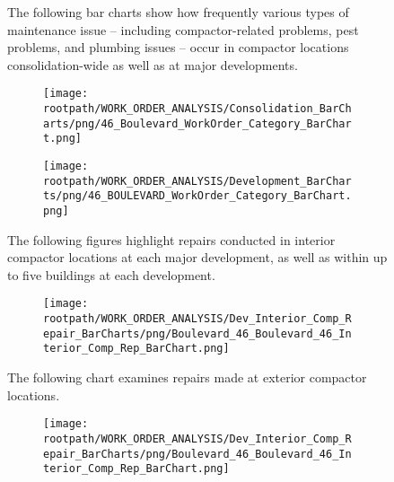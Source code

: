 \begin{figure}[h]
                                \sf
                                The following bar charts show how frequently various types of maintenance issue -- including compactor-related problems, pest problems, and plumbing issues -- occur in compactor locations consolidation-wide as well as at major developments.
                                \raggedright
                                \begin{subfigure}{\textwidth}
                                \texttt{[image: \\rootpath/WORK\_ORDER\_ANALYSIS/Consolidation\_BarCharts/png/46\_Boulevard\_WorkOrder\_Category\_BarChart.png]}
                                \end{subfigure}
                                \begin{subfigure}{\textwidth}
                                    \texttt{[image: \\rootpath/WORK\_ORDER\_ANALYSIS/Development\_BarCharts/png/46\_BOULEVARD\_WorkOrder\_Category\_BarChart.png]}
                                    \end{subfigure}
                                    \end{figure}\begin{figure}[h]
                                \raggedright
                                \sf
                                The following figures highlight repairs conducted in interior compactor locations at each major development, as well as within up to five buildings at each development.\\
                                \begin{subfigure}{\textwidth}
                                    \texttt{[image: \\rootpath/WORK\_ORDER\_ANALYSIS/Dev\_Interior\_Comp\_Repair\_BarCharts/png/Boulevard\_46\_Boulevard\_46\_Interior\_Comp\_Rep\_BarChart.png]}
                                    \end{subfigure}
                                    
                                    \end{figure}\begin{figure}[h]
                                \sf
                                \raggedright
                                The following chart examines repairs made at exterior compactor locations.
                                \sf
                                \begin{subfigure}{\textwidth}
                                    \texttt{[image: \\rootpath/WORK\_ORDER\_ANALYSIS/Dev\_Interior\_Comp\_Repair\_BarCharts/png/Boulevard\_46\_Boulevard\_46\_Interior\_Comp\_Rep\_BarChart.png]}
                                    \end{subfigure}
                                    \end{figure}